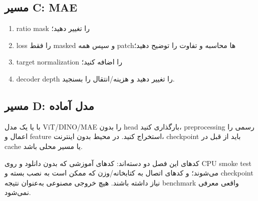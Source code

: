 \documentclass[12pt,openany,oneside]{book}
\begin{document}
\subsection{مسیر C: MAE}
\begin{enumerate}
\item ratio mask را تغییر دهید؛
\item loss را فقط masked و سپس همه patchها محاسبه و تفاوت را توضیح دهید؛
\item target normalization را اضافه کنید؛
\item decoder depth را تغییر دهید و هزینه/انتقال را بسنجید.
\end{enumerate}

\subsection{مسیر D: مدل آماده}
با  یا  یک مدل ViT/DINO/MAE را بدون head بارگذاری کنید، preprocessing رسمی را اعمال و feature استخراج کنید. در محیط بدون اینترنت، checkpoint باید از قبل در cache یا مسیر محلی باشد.

\begin{latin}

\end{latin}

\begin{codecontract}
کدهای این فصل دو دسته‌اند: کدهای آموزشی که بدون دانلود و روی CPU smoke test می‌شوند؛ و کدهای اتصال به کتابخانه/وزن که ممکن است به نصب بسته و checkpoint نیاز داشته باشند. هیچ خروجی مصنوعی به‌عنوان نتیجه benchmark واقعی معرفی نمی‌شود.
\end{codecontract}
\end{document}
